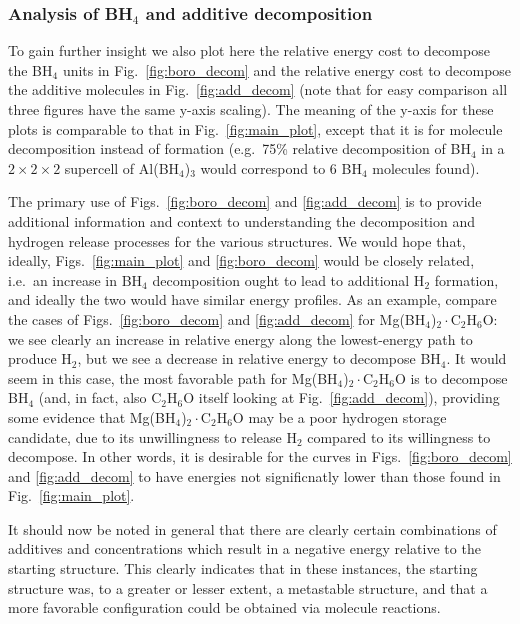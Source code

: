 \documentclass[twocolumn, prb, showpacs]{revtex4-1}
\begin{document}
\subsubsection{Analysis of BH$_4$ and additive decomposition}

To gain further insight we also plot here the relative energy cost to decompose
the BH$_4$ units in Fig.~\ref{fig:boro_decom} and the relative energy cost to 
decompose the additive molecules in Fig.~\ref{fig:add_decom} (note that for easy comparison all three figures
have the same y-axis scaling). The meaning of the y-axis for these plots is comparable to that in Fig.~\ref{fig:main_plot},
except that it is for molecule decomposition instead of formation (e.g.\ 75\% relative decomposition of BH$_4$ in a $2\times2\times2$
supercell of Al(BH$_4$)$_3$ would correspond to 6 BH$_4$ molecules found). 

The primary use of Figs.~\ref{fig:boro_decom} and \ref{fig:add_decom} is to provide additional information and context
to understanding the decomposition and hydrogen release processes for the various structures. We would hope that,
ideally, Figs.~\ref{fig:main_plot} and \ref{fig:boro_decom} would be closely related, i.e.\ an increase in BH$_4$ decomposition
ought to lead to additional H$_2$ formation, and ideally the two would have similar energy profiles. As an example, compare the cases
of Figs.~\ref{fig:boro_decom} and \ref{fig:add_decom} for Mg(BH$_4$)$_2\cdot$C$_2$H$_6$O: we see clearly an increase
in relative energy along the lowest-energy path to produce H$_2$, but we see a decrease in relative energy to decompose BH$_4$. It would seem in this case, the most favorable path for Mg(BH$_4$)$_2\cdot$C$_2$H$_6$O is to decompose BH$_4$ (and, in fact, also
C$_2$H$_6$O itself looking at Fig.~\ref{fig:add_decom}), providing some evidence that Mg(BH$_4$)$_2\cdot$C$_2$H$_6$O
may be a poor hydrogen storage candidate, due to its unwillingness to release H$_2$ compared to its willingness to
decompose. In other words, it is desirable for the curves in Figs.~\ref{fig:boro_decom} and \ref{fig:add_decom} to have
energies not significnatly lower than those found in Fig.~\ref{fig:main_plot}. 

It should now be noted in general that there are clearly certain combinations of additives and concentrations
which result in a negative energy relative to the starting structure. This clearly indicates that in these instances,
the starting structure was, to a greater or lesser extent, a metastable structure, and that a more favorable
configuration could be obtained via molecule reactions.
\end{document}
